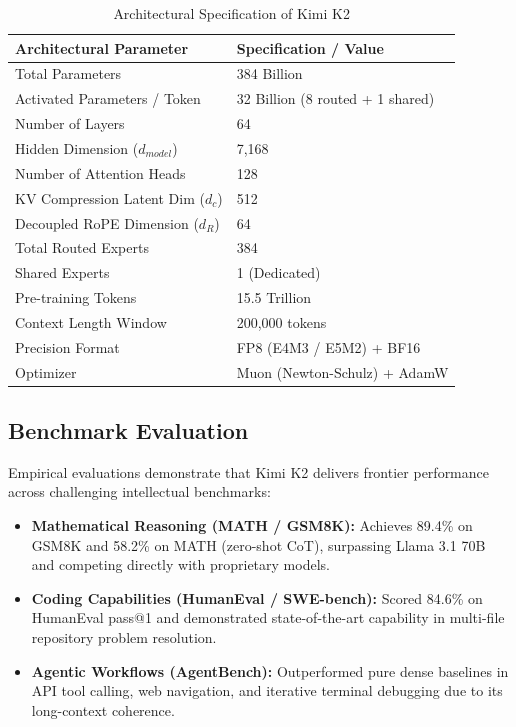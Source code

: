 \documentclass[conference]{IEEEtran}
\begin{document}
\begin{table}[htbp]
\caption{Architectural Specification of Kimi K2}
\label{tab:specs}
\centering
\begin{tabular}{ll}
\toprule
\textbf{Architectural Parameter} & \textbf{Specification / Value} \\
\midrule
Total Parameters & 384 Billion \\
Activated Parameters / Token & 32 Billion (8 routed + 1 shared) \\
Number of Layers & 64 \\
Hidden Dimension ($d_{model}$) & 7,168 \\
Number of Attention Heads & 128 \\
KV Compression Latent Dim ($d_c$) & 512 \\
Decoupled RoPE Dimension ($d_R$) & 64 \\
Total Routed Experts & 384 \\
Shared Experts & 1 (Dedicated) \\
Pre-training Tokens & 15.5 Trillion \\
Context Length Window & 200,000 tokens \\
Precision Format & FP8 (E4M3 / E5M2) + BF16 \\
Optimizer & Muon (Newton-Schulz) + AdamW \\
\bottomrule
\end{tabular}
\end{table}

\subsection{Benchmark Evaluation}
Empirical evaluations demonstrate that Kimi K2 delivers frontier performance across challenging intellectual benchmarks:
\begin{itemize}
    \item \textbf{Mathematical Reasoning (MATH / GSM8K):} Achieves 89.4\% on GSM8K and 58.2\% on MATH (zero-shot CoT), surpassing Llama 3.1 70B and competing directly with proprietary models.
    \item \textbf{Coding Capabilities (HumanEval / SWE-bench):} Scored 84.6\% on HumanEval pass@1 and demonstrated state-of-the-art capability in multi-file repository problem resolution.
    \item \textbf{Agentic Workflows (AgentBench):} Outperformed pure dense baselines in API tool calling, web navigation, and iterative terminal debugging due to its long-context coherence.
\end{itemize}
\end{document}

